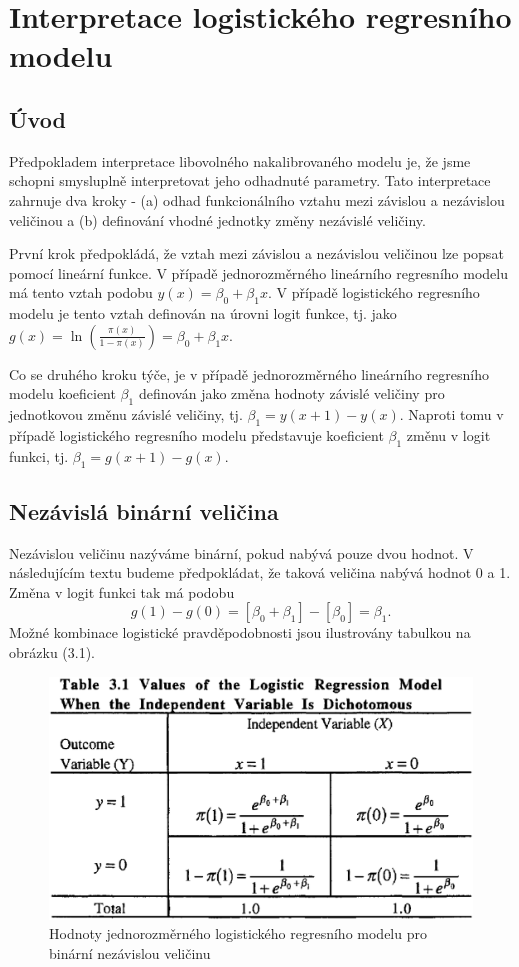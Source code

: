 \chapter{Interpretace logistického regresního modelu}

\section{Úvod}

Předpokladem interpretace libovolného nakalibrovaného modelu je, že jsme schopni smysluplně interpretovat jeho odhadnuté parametry. Tato interpretace zahrnuje dva kroky - (a) odhad funkcionálního vztahu mezi závislou a nezávislou veličinou a (b) definování vhodné jednotky změny nezávislé veličiny.

První krok předpokládá, že vztah mezi závislou a nezávislou veličinou lze popsat pomocí lineární funkce. V případě jednorozměrného lineárního regresního modelu má tento vztah podobu $y(x) = \beta_0 + \beta_1 x$. V případě logistického regresního modelu je tento vztah definován na úrovni logit funkce, tj. jako $g(x) = \ln \left(\frac{\pi(x)}{1 - \pi(x)}\right) = \beta_0 + \beta_1 x$.

Co se druhého kroku týče, je v případě jednorozměrného lineárního regresního modelu koeficient $\beta_1$ definován jako změna hodnoty závislé veličiny pro jednotkovou změnu závislé veličiny, tj. $\beta_1 = y(x + 1) - y(x)$. Naproti tomu v případě logistického regresního modelu představuje koeficient $\beta_1$ změnu v logit funkci, tj. $\beta_1 = g(x + 1) - g(x)$.

\section{Nezávislá binární veličina}

Nezávislou veličinu nazýváme binární, pokud nabývá pouze dvou hodnot. V následujícím textu budeme předpokládat, že taková veličina nabývá hodnot 0 a 1. Změna v logit funkci tak má podobu
\begin{equation}
g(1) - g(0) = [\beta_0 + \beta_1] - [\beta_0] = \beta_1.
\end{equation}
Možné kombinace logistické pravděpodobnosti jsou ilustrovány tabulkou na obrázku (3.1).
\begin{figure}[htp]
\centering
\includegraphics[scale = 0.35]{pictures/tbl_3_1.eps}
\caption{Hodnoty jednorozměrného logistického regresního modelu pro binární nezávislou veličinu}
\label{tbl_3_1}
\end{figure}

